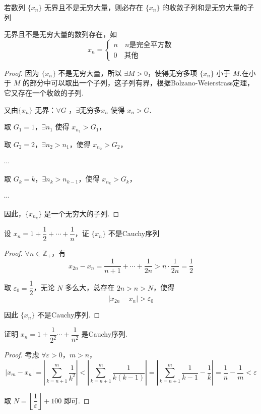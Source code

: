 \begin{proposition}
	若数列 $\{x_n\}$ 无界且不是无穷大量，则必存在 $\{x_n\}$ 的收敛子列和是无穷大量的子列
	
	无界且不是无穷大量的数列存在，如\[x_n=\begin{cases}
		n\quad n\text{是完全平方数} \\
		0\quad \text{其他} 
	\end{cases}\]
\end{proposition}
\begin{proof}
	因为 $\{x_n\}$ 不是无穷大量，所以 $\exists M > 0$，使得无穷多项 $\{x_n\}$ 小于 $M$.在小于 $M$ 的部分中可以取出一个子列，这子列有界，根据Bolzano-Weierstrass定理，它又存在一个收敛的子列.
	
	又由$\{x_n\}$ 无界：$\forall G$ ，$\exists\textbf{无穷多} x_n$ 使得 $x_{n} > G$.
	
	取 $G_1 = 1$，$\exists n_1$ 使得 $x_{n_1} > G_1$，
	
	取 $G_2 = 2$，$\exists n_2 > n_1$，使得 $x_{n_2} > G_2$，
	
	$\cdots$
	
	取 $G_k = k$，$\exists n_k > n_{k-1}$，使得 $x_{n_k} > G_k$，
	
	$\cdots$
	
	因此，$\{x_{n_k}\}$ 是一个无穷大的子列.
\end{proof}
\begin{example}
	设 $x_n = 1 + \dfrac{1}{2} + \cdots + \dfrac{1}{n}$，证 $\{x_n\}$ 不是Cauchy序列
	
	
	
\end{example}
\begin{proof}
	$\forall n \in \mathbb{Z}_+$，有
	\[
	x_{2n} - x_n = \frac{1}{n+1} + \cdots + \frac{1}{2n} > n \cdot \frac{1}{2n} = \frac{1}{2}
	\]
	
	取 $\varepsilon_0 = \dfrac{1}{2}$，无论 $N$ 多么大，总存在 $2n> n>N$，使得
	\[
	|x_{2n} - x_n| > \varepsilon_0
	\]
	
	因此 $\{x_n\}$ 不是Cauchy序列.
	
\end{proof}
\begin{example}
	证明 $x_n = 1+\dfrac{1}{2^2}\cdots+\dfrac{1}{n^2}$ 是Cauchy序列.
	
\end{example}
\begin{proof}
	考虑 $\forall \varepsilon > 0$，$m > n$，
	$$|x_m - x_n| = \left| \sum_{k=n+1}^m  \frac{1}{k^2} \right| < \left|\sum_{k=n+1}^m  \frac{1}{k(k-1)} \right|=\left|\sum_{k=n+1}^m  \frac{1}{k-1}-\frac{1}{k} \right|=\frac{1}{n}-\frac{1}{m} < \varepsilon$$
	
	
	取 $N = \left\lfloor \dfrac{1}{\varepsilon} \right\rfloor + 100$ 即可.
	
\end{proof}
